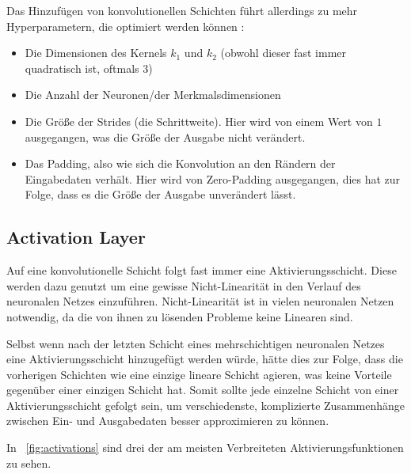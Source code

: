 Das Hinzufügen von konvolutionellen Schichten führt allerdings zu mehr Hyperparametern, die optimiert werden können \cite{cs231n}:
\begin{itemize}
	\item Die Dimensionen des Kernels $k_1$ und $k_2$ (obwohl dieser fast immer quadratisch ist, oftmals $3$)
	\item Die Anzahl der Neuronen/der Merkmalsdimensionen
	\item Die Größe der Strides (die Schrittweite). Hier wird von einem Wert von $1$ ausgegangen, was die Größe der Ausgabe nicht verändert.
	\item Das Padding, also wie sich die Konvolution an den Rändern der Eingabedaten verhält. Hier wird von Zero-Padding ausgegangen, dies hat zur Folge, dass es die Größe der Ausgabe unverändert lässt.
\end{itemize}

\subsection{Activation Layer}
\label{ssec:activation}

Auf eine konvolutionelle Schicht folgt fast immer eine Aktivierungsschicht. Diese werden dazu genutzt um eine gewisse Nicht-Linearität in den Verlauf des neuronalen Netzes einzuführen. Nicht-Linearität ist in vielen neuronalen Netzen notwendig, da die von ihnen zu lösenden Probleme keine Linearen sind. \cite[Kap.~6]{deeplearning_16}

Selbst wenn nach der letzten Schicht eines mehrschichtigen neuronalen Netzes eine Aktivierungsschicht hinzugefügt werden würde, hätte dies zur Folge, dass die vorherigen Schichten wie eine einzige lineare Schicht agieren, was keine Vorteile gegenüber einer einzigen Schicht hat. Somit sollte jede einzelne Schicht von einer Aktivierungsschicht gefolgt sein, um verschiedenste, komplizierte Zusammenhänge zwischen Ein- und Ausgabedaten besser approximieren zu können. \cite[Kap.~3]{deeplearning_18}

In \figurename~\ref{fig:activations} sind drei der am meisten Verbreiteten Aktivierungsfunktionen zu sehen.

